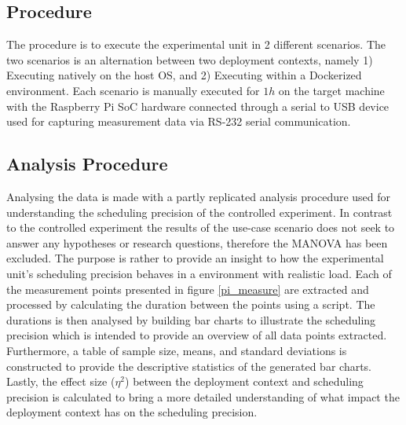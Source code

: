 \subsection{Procedure}

The procedure is to execute the experimental unit in 2 different scenarios. The two scenarios is an alternation between two deployment contexts, namely 1) Executing natively on the host OS, and 2) Executing within a Dockerized environment. Each scenario is manually executed for $1h$ on the target machine with the Raspberry Pi SoC \cite{raspberry} hardware connected through a serial to USB device used for capturing measurement data via RS-232 serial communication.\\


\subsection{Analysis Procedure}

Analysing the data is made with a partly replicated analysis procedure used for understanding the scheduling precision of the controlled experiment. In contrast to the controlled experiment the results of the use-case scenario does not seek to answer any hypotheses or research questions, therefore the MANOVA has been excluded. The purpose is rather to provide an insight to how the experimental unit's scheduling precision behaves in a environment with realistic load. Each of the measurement points presented in figure \ref{pi_measure} are extracted and processed by calculating the duration between the points using a script. The durations is then analysed by building bar charts to illustrate the scheduling precision which is intended to provide an overview of all data points extracted. Furthermore, a table of sample size, means, and standard deviations is constructed to provide the descriptive statistics of the generated bar charts. Lastly, the effect size ($\eta^{2}$) between the deployment context and scheduling precision is calculated to bring a more detailed understanding of what impact the deployment context has on the scheduling precision.\\








